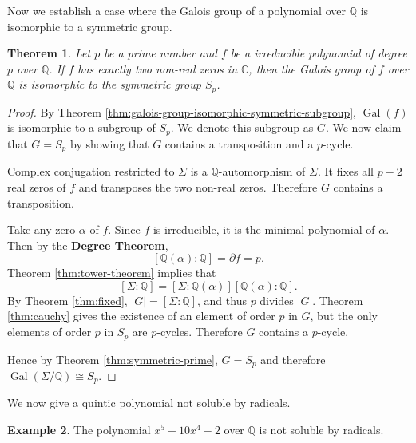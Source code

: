 \documentclass[12pt]{article}
\newtheorem{theorem}{Theorem}
\theoremstyle{definition}
\newtheorem{example}[theorem]{Example}
\newcommand{\Gal}{\operatorname{Gal}}
\begin{document}
Now we establish a case where the Galois group of a polynomial over $\mathbb Q$ is isomorphic to a symmetric group.

\begin{theorem} \label{thm:galois-iso-symmetric}
    Let $p$ be a prime number and $f$ be a irreducible polynomial of degree $p$ over $\mathbb Q$. If $f$ has exactly two non-real zeros in $\mathbb C$, then the Galois group of $f$ over $\mathbb Q$ is isomorphic to the symmetric group $S_p$.
\end{theorem}

\begin{proof}
	By Theorem \ref{thm:galois-group-isomorphic-symmetric-subgroup}, $\Gal(f)$ is isomorphic to a subgroup of $S_p$. We denote this subgroup as $G$. We now claim that $G = S_p$ by showing that $G$ contains a transposition and a $p$-cycle.

    Complex conjugation restricted to $\Sigma$ is a $\mathbb Q$-automorphism of $\Sigma$. It fixes all $p - 2$ real zeros of $f$ and transposes the two non-real zeros. Therefore $G$ contains a transposition. 

    Take any zero $\alpha$ of $f$. Since $f$ is irreducible, it is the minimal polynomial of $\alpha$. Then by the \textbf{Degree Theorem}, $$[\mathbb Q(\alpha) : \mathbb Q] = \partial f = p. $$ Theorem \ref{thm:tower-theorem} implies that $$[\Sigma : \mathbb Q] = [\Sigma : \mathbb Q(\alpha)] [ \mathbb Q(\alpha) : \mathbb Q]. $$ By Theorem \ref{thm:fixed}, $|G| = [\Sigma : \mathbb Q]$, and thus $p$ divides $|G|$. Theorem \ref{thm:cauchy} gives the existence of an element of order $p$ in $G$, but the only elements of order $p$ in $S_p$ are $p$-cycles. Therefore $G$ contains a $p$-cycle.

    Hence by Theorem \ref{thm:symmetric-prime}, $ G = S_p$ and therefore $\Gal(\Sigma / \mathbb Q) \cong S_p$.
\end{proof}

We now give a quintic polynomial not soluble by radicals. 

\begin{example}
    The polynomial $x^5 + 10 x^4 - 2$ over $\mathbb Q$ is not soluble by radicals.
\end{example}
\end{document}

